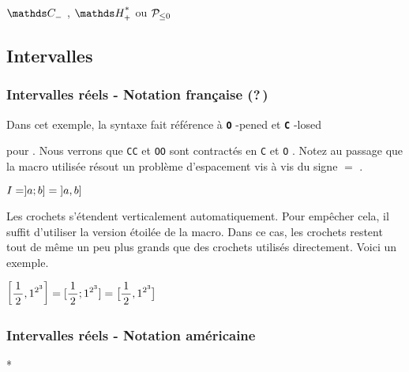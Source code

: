 \documentclass[12pt,a4paper]{article}
\makeatletter
\theoremstyle{definition}
\newcommand\whyprefix[2]{%
	\textbf{\prefix{#1}}-#2%
}
\newcommand\prefix[1]{%
	\texttt{#1}%
}
\newcommand\inenglish{\@ifstar{\@inenglish@star}{\@inenglish@no@star}}
\newcommand\@inenglish@star[1]{%
	\emph{\og #1 \fg}%
}
\newcommand\@inenglish@no@star[1]{%
	\@inenglish@star{#1} en anglais%
}
\newcounter{paraexample}[subsubsection]
\newcommand\@newexample@abstract[2]{%
	\paragraph{%
		#1%
		\if\relax\detokenize{#2}\relax\else {} -- #2\fi%
	}%
}
\newcommand\newparaexample{\@ifstar{\@newparaexample@star}{\@newparaexample@no@star}}
\newcommand\@newparaexample@no@star[1]{%
	\refstepcounter{paraexample}%
	\@newexample@abstract{Exemple \theparaexample}{#1}%
}
\newcommand\@newparaexample@star[1]{%
	\@newexample@abstract{Exemple}{#1}%
}
\makeatother
\begin{document}
\begin{latexex}
$\setspecial{\CC}{n}$ ,
$\setspecial{\HH}{sp}$ ou
$\setspecial*{\setproba{P}}{n}$
\end{latexex}



\subsection{Intervalles}

\subsubsection{Intervalles réels - Notation française (?\,)}

\newparaexample{}

Dans cet exemple, la syntaxe fait référence à 
\whyprefix{O}{pened} et \whyprefix{C}{losed}
pour
\inenglish{ouvert et fermé}.
Nous verrons que \prefix{CC} et \prefix{OO} sont contractés en \prefix{C} et \prefix{O}.
Notez au passage que la macro utilisée résout un problème d'espacement vis à vis du signe $=$ .

\begin{latexex}
$I = ]a ; b] = \intervalOC{a}{b}$
\end{latexex}




\newparaexample{}

Les crochets s'étendent verticalement automatiquement. Pour empêcher cela, il suffit d'utiliser la version étoilée de la macro.
Dans ce cas, les crochets restent tout de même un peu plus grands que des crochets utilisés directement. Voici un exemple.

\begin{latexex}
$\displaystyle
 \intervalC{ \frac{1}{2} }{ 1^{2^{3}} }
 =
 [ \frac{1}{2} ; 1^{2^{3}} ]
 =
 \intervalC*{ \frac{1}{2} }{ 1^{2^{3}} }$
\end{latexex}




\subsubsection{Intervalles réels - Notation américaine}

\newparaexample*{}
\end{document}
